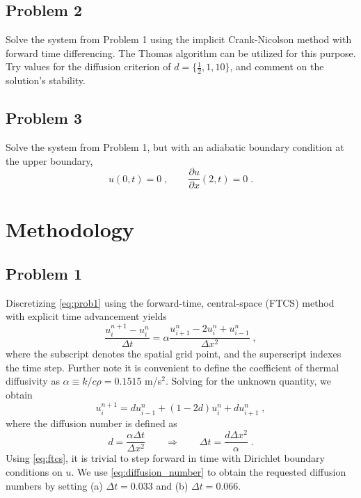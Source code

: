 \documentclass[11pt]{article}
\begin{document}
\subsection{Problem 2}

Solve the system from Problem 1 using the implicit Crank-Nicolson method with forward time differencing. The Thomas algorithm can be utilized for this purpose. Try values for the diffusion criterion of $d = \{\tfrac{1}{2}, 1, 10\}$, and comment on the solution's stability.

\subsection{Problem 3}

Solve the system from Problem 1, but with an adiabatic boundary condition at the upper boundary,
\begin{equation}
u(0,t) = 0 \;, \qquad \frac{\partial u}{\partial x}(2,t) = 0
\;.
\label{eq:prob3}
\end{equation}

\section{Methodology} %

\subsection{Problem 1}

Discretizing \eqref{eq:prob1} using the forward-time, central-space (FTCS) method with explicit time advancement yields
\begin{equation}
\frac{u_i^{n+1} - u_i^n}{\Delta t} = \alpha \frac{u_{i+1}^n - 2u_i^n + u_{i-1}^n}{\Delta x^2}
\;,
\end{equation}
where the subscript denotes the spatial grid point, and the superscript indexes the time step. Further note it is convenient to define the coefficient of thermal diffusivity as $\alpha \equiv k / c \rho = 0.1515$ m/s$^2$. Solving for the unknown quantity, we obtain
\begin{equation}
u_i^{n+1} = d u_{i-1}^n + (1-2d) u_i^n + d u_{i+1}^n
\;,
\label{eq:ftcs}
\end{equation}
where the diffusion number is defined as
\begin{equation}
d = \frac{\alpha \Delta t}{\Delta x^2} 
\qquad \Rightarrow \qquad
\Delta t = \frac{d \Delta x^2}{\alpha}
\;.
\label{eq:diffusion_number}
\end{equation}
Using \eqref{eq:ftcs}, it is trivial to step forward in time with Dirichlet boundary conditions on $u$. We use \eqref{eq:diffusion_number} to obtain the requested diffusion numbers by setting (a) $\Delta t = 0.033$ and (b) $\Delta t = 0.066$.
\end{document}
